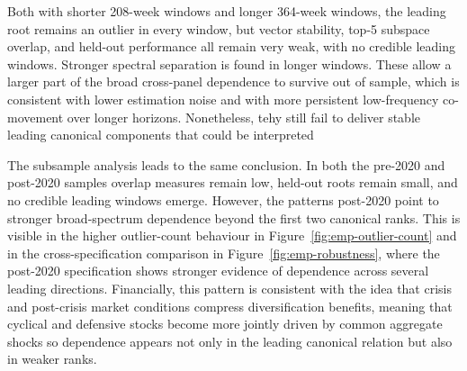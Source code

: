 \documentclass[12pt]{report} %
\begin{document}
Both with shorter 208-week windows and longer 364-week windows, the leading root remains an 
outlier in every window, but vector stability, top-5 subspace overlap, and held-out performance all remain very weak, with no credible 
leading windows. Stronger spectral separation is found in longer windows. These allow a larger part 
of the broad cross-panel dependence to survive out of sample, which is consistent with lower estimation noise and 
with more persistent low-frequency co-movement over longer horizons. Nonetheless, tehy still
fail to deliver stable leading canonical components that could be interpreted

The subsample analysis leads to the same conclusion. In both the pre-2020 and post-2020 samples
overlap measures remain low, held-out roots remain small, and no credible leading windows emerge. 
However, the patterns post-2020 point to stronger broad-spectrum 
dependence beyond the first two canonical ranks. This is visible in the 
higher outlier-count behaviour in Figure~\ref{fig:emp-outlier-count} and in the 
cross-specification comparison in Figure~\ref{fig:emp-robustness}, where the post-2020 specification 
shows stronger evidence of dependence across several leading directions. 
Financially, this pattern is consistent with the idea that crisis and post-crisis market 
conditions compress diversification benefits, meaning that cyclical and defensive stocks become 
more jointly driven by common aggregate shocks so dependence appears not only in the 
leading canonical relation but also in weaker ranks. 




\end{document}
